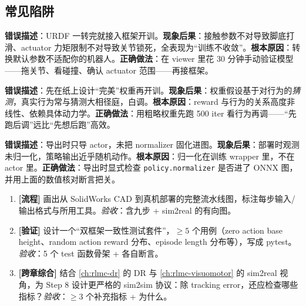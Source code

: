 \subsection{常见陷阱}
\label{sec:rlmc-diy-pipe-pitfalls}

\begin{pitfall}
\textbf{错误描述}：URDF 一转完就接入框架开训。\textbf{现象后果}：接触参数不对导致脚底打滑、actuator 力矩限制不对导致关节锁死，全表现为“训练不收敛”。\textbf{根本原因}：转换默认参数不适配你的机器人。\textbf{正确做法}：在 viewer 里花 30 分钟手动验证模型——拖关节、看碰撞、确认 actuator 范围——再接框架。
\end{pitfall}

\begin{pitfall}
\textbf{错误描述}：先在纸上设计“完美”权重再开训。\textbf{现象后果}：权重假设基于对行为的\emph{猜测}，真实行为常与猜测大相径庭，白调。\textbf{根本原因}：reward 与行为的关系高度非线性、依赖具体动力学。\textbf{正确做法}：用粗略权重先跑 500 iter 看行为再调——“先跑后调”远比“先想后跑”高效。
\end{pitfall}

\begin{pitfall}
\textbf{错误描述}：导出时只导 actor，未把 normalizer 固化进图。\textbf{现象后果}：部署时观测未归一化，策略输出近乎随机动作。\textbf{根本原因}：归一化在训练 wrapper 里，不在 actor 里。\textbf{正确做法}：导出时显式检查 \verb|policy.normalizer| 是否进了 ONNX 图，并用上面的数值核对断言把关。
\end{pitfall}

\begin{practice}[端到端流水线]
\begin{enumerate}
\item \textbf{[流程]} 画出从 SolidWorks CAD 到真机部署的完整流水线图，标注每步输入/输出格式与所用工具。\emph{验收}：含九步 + sim2real 的有向图。
\item \textbf{[验证]} 设计一个“双框架一致性测试套件”，$\ge 5$ 个用例（zero action base height、random action reward 分布、episode length 分布等），写成 pytest。\emph{验收}：5 个 test 函数骨架 + 各自断言。
\item \textbf{[跨章综合]} 结合 \cref{ch:rlmc-dr} 的 DR 与 \cref{ch:rlmc-visuomotor} 的 sim2real 视角，为 Step 8 设计更严格的 sim2sim 协议：除 tracking error，还应检查哪些指标？\emph{验收}：$\ge 3$ 个补充指标 + 为什么。
\end{enumerate}
\end{practice}

